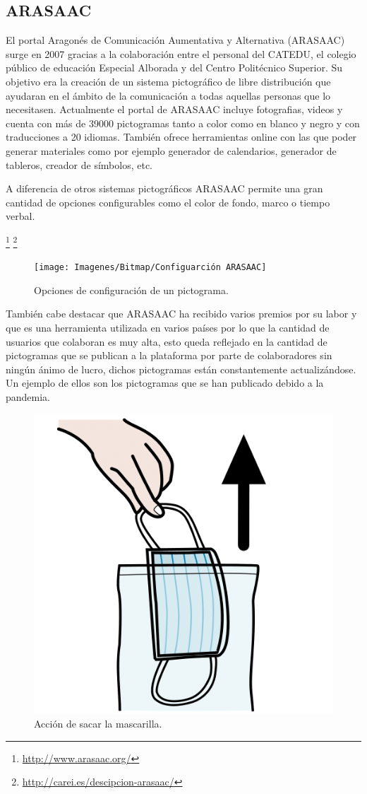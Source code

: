 \subsection{ARASAAC}

El portal Aragonés de Comunicación Aumentativa y Alternativa (ARASAAC) surge en 2007 gracias a la colaboración entre el personal del CATEDU, el colegio público de educación Especial Alborada y del Centro Politécnico Superior. Su objetivo era la creación de un sistema pictográfico de libre distribución que ayudaran en el ámbito de la comunicación a todas aquellas personas que lo necesitasen.
Actualmente el portal de ARASAAC incluye fotografias, videos y cuenta con más de 39000 pictogramas tanto a color como en blanco y negro y con traducciones a 20 idiomas. También ofrece herramientas online con las que poder generar materiales como por ejemplo generador de calendarios, generador de tableros, creador de símbolos, etc.

A diferencia de otros sistemas pictográficos ARASAAC permite una gran cantidad de opciones configurables como el color de fondo, marco o tiempo verbal.

\footnote{\url{http://www.arasaac.org/}}
\footnote{\url{http://carei.es/descipcion-arasaac/}}

\begin{figure}[h!]
	\centering
	\texttt{[image: Imagenes/Bitmap/Configuarción ARASAAC]}
	\caption{Opciones de configuración de un pictograma.}
	\label{fig:configuarcion-arasaac}
\end{figure}



También cabe destacar que ARASAAC ha recibido varios premios por su labor y que es una herramienta utilizada en varios países por lo que la cantidad de usuarios que colaboran es muy alta, esto queda reflejado en la cantidad de pictogramas que se publican a la plataforma por parte de colaboradores sin ningún ánimo de lucro, dichos pictogramas están constantemente actualizándose. Un ejemplo de ellos son los pictogramas que se han publicado debido a la pandemia.

\newpage
\begin{figure}[h!]
	\centering
	\includegraphics[width=0.2\linewidth]{Imagenes/Bitmap/Picto Mascarilla}
	\caption{Acción de sacar la mascarilla.}
	\label{fig:picto-mascarilla}
\end{figure}

